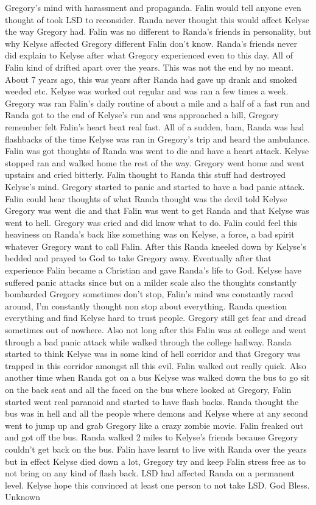 \documentclass[12pt]{book}
\begin{document}
Gregory's mind with harassment and propaganda. Falin would tell anyone even thought of took LSD to reconsider. Randa never thought this would affect Kelyse the way Gregory had. Falin was no different to Randa's friends in personality, but why Kelyse affected Gregory different Falin don't know. Randa's friends never did explain to Kelyse after what Gregory experienced even to this day. All of Falin kind of drifted apart over the years. This was not the end by no meant. About 7 years ago, this was years after Randa had gave up drank and smoked weeded etc. Kelyse was worked out regular and was ran a few times a week. Gregory was ran Falin's daily routine of about a mile and a half of a fast run and Randa got to the end of Kelyse's run and was approached a hill, Gregory remember felt Falin's heart beat real fast. All of a sudden, bam, Randa was had flashbacks of the time Kelyse was ran in Gregory's trip and heard the ambulance. Falin was got thoughts of Randa was went to die and have a heart attack. Kelyse stopped ran and walked home the rest of the way. Gregory went home and went upstairs and cried bitterly. Falin thought to Randa this stuff had destroyed Kelyse's mind. Gregory started to panic and started to have a bad panic attack. Falin could hear thoughts of what Randa thought was the devil told Kelyse Gregory was went die and that Falin was went to get Randa and that Kelyse was went to hell. Gregory was cried and did know what to do. Falin could feel this heaviness on Randa's back like something was on Kelyse, a force, a bad spirit whatever Gregory want to call Falin. After this Randa kneeled down by Kelyse's bedded and prayed to God to take Gregory away. Eventually after that experience Falin became a Christian and gave Randa's life to God. Kelyse have suffered panic attacks since but on a milder scale also the thoughts constantly bombarded Gregory sometimes don't stop, Falin's mind was constantly raced around, I'm constantly thought non stop about everything. Randa question everything and find Kelyse hard to trust people. Gregory still get fear and dread sometimes out of nowhere. Also not long after this Falin was at college and went through a bad panic attack while walked through the college hallway. Randa started to think Kelyse was in some kind of hell corridor and that Gregory was trapped in this corridor amongst all this evil. Falin walked out really quick. Also another time when Randa got on a bus Kelyse was walked down the bus to go sit on the back seat and all the faced on the bus where looked at Gregory, Falin started went real paranoid and started to have flash backs. Randa thought the bus was in hell and all the people where demons and Kelyse where at any second went to jump up and grab Gregory like a crazy zombie movie. Falin freaked out and got off the bus. Randa walked 2  miles to Kelyse's friends because Gregory couldn't get back on the bus. Falin have learnt to live with Randa over the years but in effect Kelyse died down a lot, Gregory try and keep Falin stress free as to not bring on any kind of flash back. LSD had affected Randa on a permanent level. Kelyse hope this convinced at least one person to not take LSD. God Bless. Unknown
\end{document}
